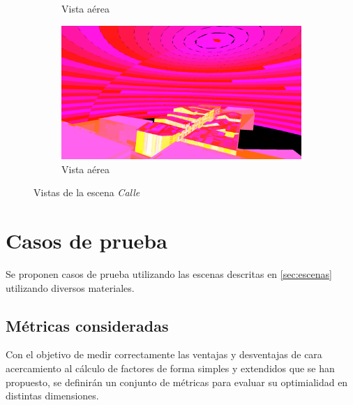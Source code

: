 \begin{figure}[H]
\begin{subfigure}{0.45\textwidth}
	\caption{Vista aérea}
	\end{subfigure}
	\begin{subfigure}{0.45\textwidth}
	\includegraphics[width=1\linewidth]{assets/street4}
	\caption{Vista aérea}
	\end{subfigure}
	\caption{Vistas de la escena \textit{Calle}}
	\label{img:street}
\end{figure}
\section{Casos de prueba}
\label{sec:pruebas}

Se proponen casos de prueba utilizando las escenas descritas en \ref{sec:escenas} utilizando diversos materiales.

\subsection{Métricas consideradas}

Con el objetivo de medir correctamente las ventajas y desventajas de cara acercamiento al cálculo de factores de forma simples y extendidos que se han propuesto, se definirán un conjunto de métricas para evaluar su optimialidad en distintas dimensiones.


